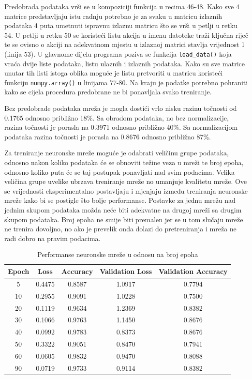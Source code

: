 \documentclass[times, utf8, diplomski]{fer}
\begin{document}
Predobrada podataka vrši se u kompoziciji funkcija u recima 46-48. Kako sve 4 matrice predstavljaju
istu radnju potrebno je za svaku u matricu izlaznih podataka 4 puta umetnuti ispravnu izlaznu matricu
što se vrši u petlji u retku 54. U petlji u retku 50 se koristeći listu akcija u imenu datoteke traži
ključna riječ te se ovisno o akciji na adekvatnom mjestu u izlaznoj matrici stavlja vrijednost 1
(linija 53). U glavnome dijelu programa poziva se funkcija \texttt{load\_data()} koja vraća dvije liste
podataka, listu ulaznih i izlaznih podataka. Kako su sve matrice unutar tih listi istoga oblika
moguće je listu pretvoriti u matricu koristeći funkciju \texttt{numpy.array()} u linijama 77-80.
Na kraju je podatke potrebno pohraniti kako se cijela procedura predobrane ne bi ponavljala svako
treniranje.

Bez predobrade podataka mreža je mogla dostići vrlo nisku razinu točnosti od 0.1765 odnosno približno 18\%.
Sa obradom podataka, no bez normalizacije, razina točnosti je porasla na 0.3971 odnosno približno 40\%.
Sa normalizacijom podataka razina točnosti je porasla na 0.8676 odnosno približno 87\%.

Za treniranje neuronske mreže moguće je odabrati veličinu grupe podataka, odnosno nakon koliko podataka će se
obnoviti težine veza u mreži te broj epoha, odnosno koliko puta će se taj postupak ponavljati nad svim podacima.
Velika veličina grupe uvelike ubrzava treniranje mreže no umanjuje kvalitetu mreže. Ove se vrijednosti
eksperimentalno postavljaju i mjenjaju između treniranja neuronske mreže kako bi se postigle što bolje
performanse. Postavke za jednu mrežu nad jednim skupom podataka možda neće biti adekvatne na drugoj mreži
sa drugim skupom podataka. Broj epoha ne smije biti premalen jer se u tom slučaju mreže ne trenira dovoljno,
no ako je prevelik onda dolazi do pretreniranja i mreža ne radi dobro na pravim podacima.

\begin{table} [h!]
 \centering
    \begin{tabular}{|c|c|c|c|c|}
        \hline
        Epoch & Loss & Accuracy & Validation Loss & Validation Accuracy \\
        \hline
        5 & 0.4475 & 0.8587 & 1.0917 & 0.7794 \\
        \hline
        10 & 0.2955 & 0.9091 & 1.0228 & 0.7500 \\
        \hline
        20 & 0.1119 & 0.9634 & 1.2369 & 0.8382 \\
        \hline
        30 & 0.1066 & 0.9763 & 1.1450 & 0.8676 \\
        \hline
        40 & 0.0992 & 0.9783 & 0.8373 & 0.8676 \\
        \hline
        50 & 0.3322 & 0.9051 & 0.8470 & 0.7941 \\
        \hline
        60 & 0.0605 & 0.9832 & 0.9470 & 0.8088 \\
        \hline
        90 & 0.0719 & 0.9733 & 0.9114 & 0.8382 \\
        \hline
    \end{tabular}
    \caption{Performanse neuronske mreže u odnosu na broj epoha}
    \label{data}
\end{table}
\end{document}
